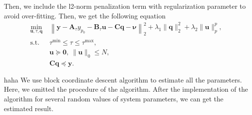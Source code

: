\documentclass[]{article}
\begin{document}
Then, we include the l2-norm penalization term with regularization parameter to avoid over-fitting. Then, we get the following equation
\begin{subequations}
  \renewcommand{\theequation}
  {\theparentequation-\arabic{equation}}
  \begin{align}
  \min\limits_{\mathbf{u}, \tau, \mathbf{q}}~&\left\lVert \mathbf{y} - \mathbf{A}_\tau y_{p_0} - \mathbf{B}_\tau \mathbf{u} - \mathbf{C} \mathbf{q} - \boldsymbol{\nu} \right\lVert^2_2 + \lambda_1 \lVert \mathbf{q} \rVert_2^2 + \lambda_2 \lVert \mathbf{u} \rVert_p^p, \\
  \mathrm{s.t.}~& \tau^{\mathrm{min}} \leqslant \tau \leqslant \tau^{\mathrm{max}}, \\
  & \mathbf{u} \succcurlyeq \mathbf{0},~ \lVert \mathbf{u} \rVert_0 \leqslant N, \\
  & \mathbf{C}\mathbf{q} \preccurlyeq \mathbf{y}.
  \end{align}
\end{subequations}

{\color{red} haha} We use block coordinate descent algorithm to estimate all the parameters. Here, we omitted the procedure of the algorithm. After the implementation of the algorithm for several random values of system parameters, we can get the estimated result.
\end{document}
